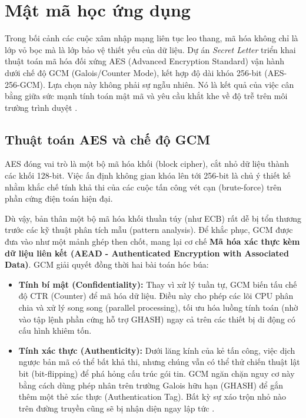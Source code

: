 \section{Mật mã học ứng dụng}

Trong bối cảnh các cuộc xâm nhập mạng liên tục leo thang, mã hóa không chỉ là lớp vỏ bọc mà là lớp bảo vệ thiết yếu của dữ liệu. Dự án \textit{Secret Letter} triển khai thuật toán mã hóa đối xứng AES (Advanced Encryption Standard) vận hành dưới chế độ GCM (Galois/Counter Mode), kết hợp độ dài khóa 256-bit (AES-256-GCM). Lựa chọn này không phải sự ngẫu nhiên. Nó là kết quả của việc cân bằng giữa sức mạnh tính toán mật mã và yêu cầu khắt khe về độ trễ trên môi trường trình duyệt \parencite{nist-sp800-38d-gcm}.

\subsection{Thuật toán AES và chế độ GCM}
AES đóng vai trò là một bộ mã hóa khối (block cipher), cắt nhỏ dữ liệu thành các khối 128-bit. Việc ấn định không gian khóa lên tới 256-bit là chủ ý thiết kế nhằm khắc chế tính khả thi của các cuộc tấn công vét cạn (brute-force) trên phần cứng điện toán hiện đại. 

Dù vậy, bản thân một bộ mã hóa khối thuần túy (như ECB) rất dễ bị tổn thương trước các kỹ thuật phân tích mẫu (pattern analysis). Để khắc phục, GCM được đưa vào như một mảnh ghép then chốt, mang lại cơ chế \textbf{Mã hóa xác thực kèm dữ liệu liên kết (AEAD - Authenticated Encryption with Associated Data)}. 
GCM giải quyết đồng thời hai bài toán hóc búa:
\begin{itemize}
    \item \textbf{Tính bí mật (Confidentiality):} Thay vì xử lý tuần tự, GCM biến tấu chế độ CTR (Counter) để mã hóa dữ liệu. Điều này cho phép các lõi CPU phân chia và xử lý song song (parallel processing), tối ưu hóa luồng tính toán (nhờ vào tập lệnh phần cứng hỗ trợ GHASH) ngay cả trên các thiết bị di động có cấu hình khiêm tốn.
    \item \textbf{Tính xác thực (Authenticity):} Dưới lăng kính của kẻ tấn công, việc dịch ngược bản mã có thể bất khả thi, nhưng chúng vẫn có thể thử chiến thuật lật bit (bit-flipping) để phá hỏng cấu trúc gói tin. GCM ngăn chặn nguy cơ này bằng cách dùng phép nhân trên trường Galois hữu hạn (GHASH) để gắn thêm một thẻ xác thực (Authentication Tag). Bất kỳ sự xáo trộn nhỏ nào trên đường truyền cũng sẽ bị nhận diện ngay lập tức \parencite{nist-sp800-38d-gcm}.
\end{itemize}

